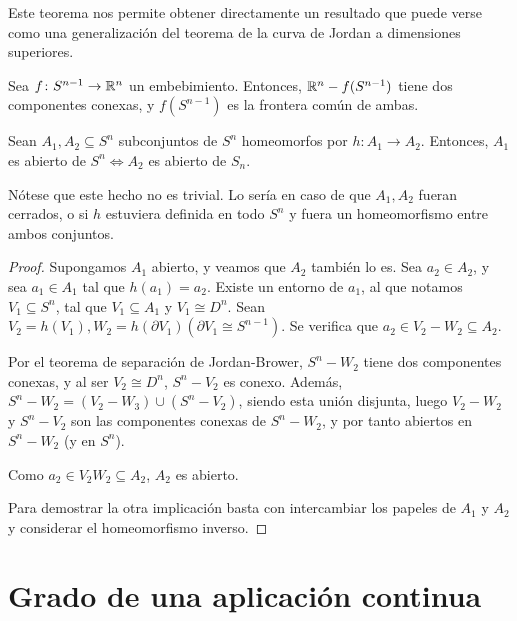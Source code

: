 Este teorema nos permite obtener directamente un resultado que puede verse como una generalización del teorema
de la curva de Jordan a dimensiones superiores.

\begin{corollary}
  Sea $f \colon S^{n-1} \to \mathbb{R}^n$ un embebimiento. Entonces, $\mathbb{R}^n - f(S^{n-1})$ tiene dos componentes conexas,
  y $f(S^{n-1})$ es la frontera común de ambas.
\end{corollary}

\begin{theorem}
  Sean $A_1, A_2 \subseteq S^n$ subconjuntos de $S^n$ homeomorfos por $h \colon A_1 \to A_2$. Entonces,
  $A_1$ es abierto de $S^n \iff A_2$ es abierto de $S_n$.
\end{theorem}

\begin{remark}
  Nótese que este hecho no es trivial. Lo sería en caso de que $A_1, A_2$ fueran cerrados, o si $h$ estuviera definida
  en todo $S^n$ y fuera un homeomorfismo entre ambos conjuntos.
\end{remark}

\begin{proof}
  Supongamos $A_1$ abierto, y veamos que $A_2$ también lo es. Sea $a_2 \in A_2$, y sea $a_1 \in A_1$ tal que $h(a_1) = a_2$.
  Existe un entorno de $a_1$, al que notamos $V_1 \subseteq S^n$, tal que $V_1 \subseteq A_1$ y $V_1 \cong D^n$. Sean
  $V_2 = h(V_1), W_2 = h(\partial V_1) (\partial V_1 \cong S^{n-1})$. Se verifica que $a_2 \in V_2 - W_2 \subseteq A_2$.

  Por el teorema de separación de Jordan-Brower, $S^n - W_2$ tiene dos componentes conexas, y al ser $V_2 \cong D^n$,
  $S^n - V_2$ es conexo. Además, $S^n - W_2 = (V_2 - W_3) \cup (S^n - V_2)$, siendo esta unión disjunta, luego $V_2 - W_2$
  y $S^n - V_2$ son las componentes conexas de $S^n - W_2$, y por tanto abiertos en $S^n - W_2$ (y en $S^n$).

  Como $a_2 \in V_2  W_2 \subseteq A_2$, $A_2$ es abierto.

  Para demostrar la otra implicación basta con intercambiar los papeles de $A_1$ y $A_2$ y considerar el homeomorfismo inverso.
\end{proof}

\section{Grado de una aplicación continua}

